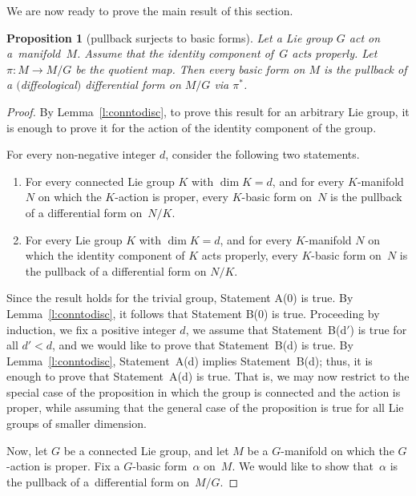 \documentclass[pdftex]{sigma}
\numberwithin{equation}{section}
\newtheorem{Proposition}[Theorem]{Proposition}
\newcommand{\hypref}[2]{{#2~\ref{#1}}}
\begin{document}
We are now ready to prove the main result of this section.

\begin{Proposition}[pullback surjects to basic forms]
\label{p:geomquot}
Let a Lie group $G$ act on a~mani\-fold~$M$.
Assume that the identity component of~$G$ acts properly.
Let $\pi \colon M \to M/G$ be the quotient map.
Then every basic form on $M$ is the pullback of a $($diffeological$)$ differential
form on $M/G$ via $\pi^*$.
\end{Proposition}

\begin{proof}
By \hypref{l:conntodisc}{Lemma}, to prove this result
for an arbitrary Lie group, it is enough to prove it
for the action of the identity component of the group.

For every non-negative integer $d$, consider the following two statements.
\begin{enumerate}\itemsep=0pt
\item[A(d):]
For every connected Lie group $K$ with $\dim K = d$,
and for every $K$-manifold $N$ on which the $K$-action is proper,
every $K$-basic form on~$N$ is the pullback of a dif\/ferential form on~$N/K$.

\item[B(d):]
For every Lie group $K$ with $\dim K = d$,
and for every $K$-manifold $N$ on which the identity component of $K$
acts properly, every $K$-basic form on~$N$ is the pullback
of a dif\/ferential form on $N/K$.
\end{enumerate}

Since the result holds for the trivial group, Statement A(0) is true.
By \hypref{l:conntodisc}{Lemma}, it follows that Statement B(0) is true.
Proceeding by induction, we f\/ix a positive integer $d$,
we assume that Statement~B(d$'$) is true for all $d' < d$,
and we would like to prove that Statement~B(d) is true.
By \hypref{l:conntodisc}{Lemma}, Statement~A(d) implies Statement~B(d);
thus, it is enough to prove that Statement~A(d) is true.
That is, we may now restrict to the special case of the proposition
in which the group is connected and the action is proper,
while assuming that the general case of the proposition is true
for all Lie groups of smaller dimension.

Now, let $G$ be a connected Lie group,
and let $M$ be a $G$-manifold on which the $G$-action is proper.
Fix a $G$-basic form~$\alpha$ on~$M$.
We would like to show that~$\alpha$ is the pullback of a~dif\/ferential form
on~$M/G$.


\end{proof}
\end{document}
